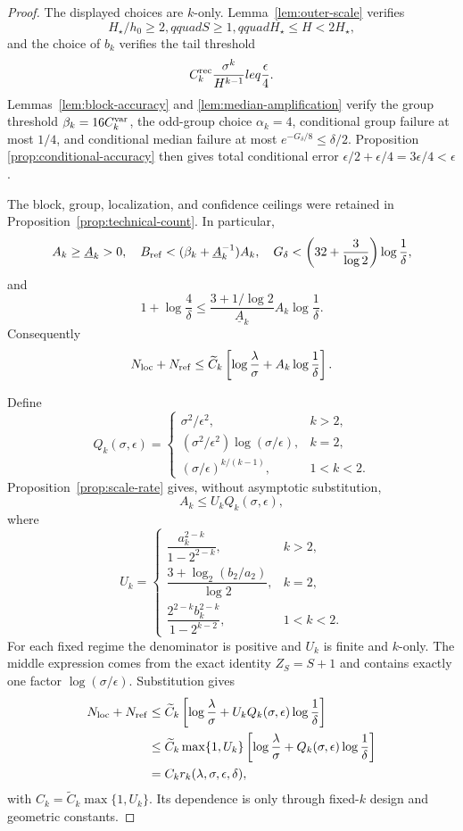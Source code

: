 \begin{proof}
The displayed choices are $k$-only.  Lemma~\ref{lem:outer-scale} verifies
\[
 H_\star/h_0\geq2,qquad S\geq1,qquad H_\star\leq H<2H_\star,
\]
and the choice of $b_k$ verifies the tail threshold
\[
 C_k^{\rm rec}\frac{\sigma^k}{H^{k-1}}leq\frac\epsilon4.
\]
Lemmas~\ref{lem:block-accuracy} and \ref{lem:median-amplification} verify the
group threshold $\beta_k=16C_k^{\rm var}$, the odd-group choice
$\alpha_k=4$, conditional group failure at most $1/4$, and conditional
median failure at most $e^{-G_\delta/8}\leq\delta/2$.  Proposition~
\ref{prop:conditional-accuracy} then gives total conditional error
$\epsilon/2+\epsilon/4=3\epsilon/4<\epsilon$.

The block, group, localization, and confidence ceilings were retained in
Proposition~\ref{prop:technical-count}.  In particular,
\[
 A_k\geq\underline A_k>0,
 \quad B_{\rm ref}<(\beta_k+\underline A_k^{-1})A_k,
 \quad G_\delta<\left(32+\frac3{\log2}\right)\log\frac1\delta,
\]
and
\[
 1+\log\frac4\delta
 \leq\frac{3+1/\log2}{\underline A_k}
 A_k\log\frac1\delta.
\]
Consequently
\[
 N_{\rm loc}+N_{\rm ref}
 \leq\widetilde C_k\left[
 \log\frac\lambda\sigma+A_k\log\frac1\delta\right].
\]

Define
\[
 Q_k(\sigma,\epsilon)=
 \begin{cases}
 \sigma^2/\epsilon^2,&k>2,\\
 (\sigma^2/\epsilon^2)\log(\sigma/\epsilon),&k=2,\\
 (\sigma/\epsilon)^{k/(k-1)},&1<k<2.
 \end{cases}
\]
Proposition~\ref{prop:scale-rate} gives, without asymptotic substitution,
\[
 A_k\leq U_kQ_k(\sigma,\epsilon),
\]
where
\[
 U_k=
 \begin{cases}
 \dfrac{a_k^{2-k}}{1-2^{2-k}},&k>2,\\[0.8em]
 \dfrac{3+\log_2(b_2/a_2)}{\log2},&k=2,\\[0.8em]
 \dfrac{2^{2-k}b_k^{2-k}}{1-2^{k-2}},&1<k<2.
 \end{cases}
\]
For each fixed regime the denominator is positive and $U_k$ is finite and
$k$-only.  The middle expression comes from the exact identity $Z_S=S+1$
and contains exactly one factor $\log(\sigma/\epsilon)$.  Substitution gives
\[
\begin{aligned}
 N_{\rm loc}+N_{\rm ref}
 &\leq\widetilde C_k\left[
 \log\frac\lambda\sigma+U_kQ_k(\sigma,\epsilon)\log\frac1\delta\right]\\
 &\leq\widetilde C_k\max\{1,U_k\}
 \left[\log\frac\lambda\sigma
 +Q_k(\sigma,\epsilon)\log\frac1\delta\right]\\
 &=C_kr_k(\lambda,\sigma,\epsilon,\delta),
\end{aligned}
\]
with $C_k=\widetilde C_k\max\{1,U_k\}$.  Its dependence is only through
fixed-$k$ design and geometric constants.


\end{proof}
